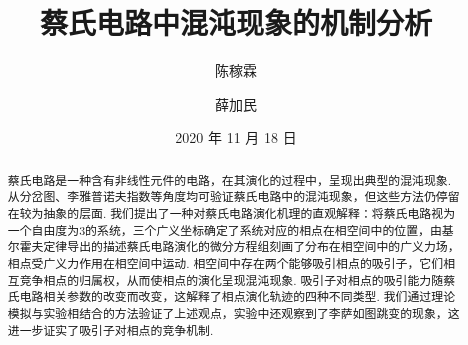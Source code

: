 \documentclass[a4paper, 10pt]{article}
\begin{document}
\title{蔡氏电路中混沌现象的机制分析}
\author{陈稼霖\and 薛加民}
\date{2020 年 11 月 18 日}
\maketitle
\begin{abstract}
蔡氏电路是一种含有非线性元件的电路，在其演化的过程中，呈现出典型的混沌现象. 从分岔图、李雅普诺夫指数等角度均可验证蔡氏电路中的混沌现象，但这些方法仍停留在较为抽象的层面. 我们提出了一种对蔡氏电路演化机理的直观解释：将蔡氏电路视为一个自由度为$3$的系统，三个广义坐标确定了系统对应的相点在相空间中的位置，由基尔霍夫定律导出的描述蔡氏电路演化的微分方程组刻画了分布在相空间中的广义力场，相点受广义力作用在相空间中运动. 相空间中存在两个能够吸引相点的吸引子，它们相互竞争相点的归属权，从而使相点的演化呈现混沌现象. 吸引子对相点的吸引能力随蔡氏电路相关参数的改变而改变，这解释了相点演化轨迹的四种不同类型. 我们通过理论模拟与实验相结合的方法验证了上述观点，实验中还观察到了李萨如图跳变的现象，这进一步证实了吸引子对相点的竞争机制.
\end{abstract}
\end{document}
